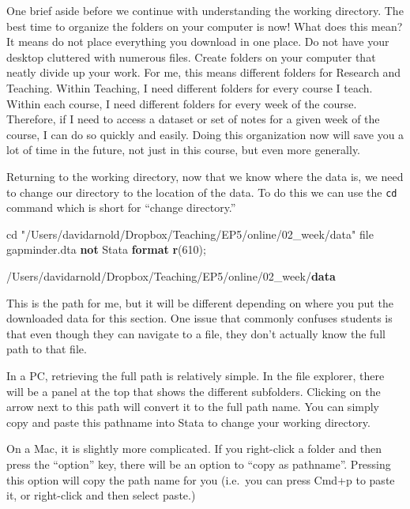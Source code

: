 \documentclass[
]{book}
\newenvironment{Shaded}{\begin{snugshade}}{\end{snugshade}}
\newcommand{\FunctionTok}[1]{\textcolor[rgb]{0.13,0.29,0.53}{\textbf{#1}}}
\newcommand{\KeywordTok}[1]{\textcolor[rgb]{0.13,0.29,0.53}{\textbf{#1}}}
\newcommand{\NormalTok}[1]{#1}
\newcommand{\StringTok}[1]{\textcolor[rgb]{0.31,0.60,0.02}{#1}}
\begin{document}
One brief aside before we continue with understanding the working directory. The best time to organize the folders on your computer is now! What does this mean? It means do not place everything you download in one place. Do not have your desktop cluttered with numerous files. Create folders on your computer that neatly divide up your work. For me, this means different folders for Research and Teaching. Within Teaching, I need different folders for every course I teach. Within each course, I need different folders for every week of the course. Therefore, if I need to access a dataset or set of notes for a given week of the course, I can do so quickly and easily. Doing this organization now will save you a lot of time in the future, not just in this course, but even more generally.

Returning to the working directory, now that we know where the data is, we need to change our directory to the location of the data. To do this we can use the \texttt{cd} command which is short for ``change directory.''

\begin{Shaded}
\begin{Highlighting}[]
\NormalTok{cd }\StringTok{"/Users/davidarnold/Dropbox/Teaching/EP5/online/02\_week/data"}
\NormalTok{file gapminder.dta }\KeywordTok{not}\NormalTok{ Stata }\KeywordTok{format}
\FunctionTok{r}\NormalTok{(610);}


\NormalTok{/Users/davidarnold/Dropbox/Teaching/EP5/online/02\_week/}\KeywordTok{data}
\end{Highlighting}
\end{Shaded}

This is the path for me, but it will be different depending on where you put the downloaded data for this section. One issue that commonly confuses students is that even though they can navigate to a file, they don't actually know the full path to that file.

In a PC, retrieving the full path is relatively simple. In the file explorer, there will be a panel at the top that shows the different subfolders. Clicking on the arrow next to this path will convert it to the full path name. You can simply copy and paste this pathname into Stata to change your working directory.

On a Mac, it is slightly more complicated. If you right-click a folder and then press the ``option'' key, there will be an option to ``copy as pathname''. Pressing this option will copy the path name for you (i.e.~you can press Cmd+p to paste it, or right-click and then select paste.)
\end{document}
